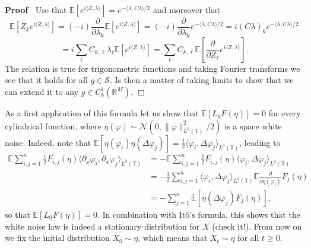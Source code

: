 \documentclass[a4paper,11pt]{article}
\newenvironment{proof}{\noindent\textbf{Proof\ }}{\hspace*{\fill}$\Box$\medskip}
\newcommand{\CS}{\mathscr{S}}
\begin{document}
\begin{proof}
  Use that $\mathbb{E} [e^{i \langle Z, \lambda \rangle}] = e^{- \langle
  \lambda, C \lambda \rangle / 2}$ and moreover that
  \[ \mathbb{E} [Z_k e^{i \langle Z, \lambda \rangle}] = (- i)
     \frac{\partial}{\partial \lambda_k} \mathbb{E} [e^{i \langle Z, \lambda
     \rangle}] = (- i) \frac{\partial}{\partial \lambda_k} e^{- \langle
     \lambda, C \lambda \rangle / 2} = i (C \lambda)_k e^{- \langle \lambda, C
     \lambda \rangle / 2} \]
  \[ = i \sum_{\ell} C_{k, \ell} \lambda_{\ell} \mathbb{E} [e^{i \langle Z,
     \lambda \rangle}] = \sum_{\ell} C_{k, \ell} \mathbb{E}
     [\frac{\partial}{\partial Z_{\ell}} e^{i \langle Z, \lambda \rangle}] .
  \]
  The relation is true for trigonometric functions and taking Fourier
  transforms we see that it holds for all $g \in \CS$. Is then a matter of
  taking limits to show that we can extend it to any $g \in C^1_b
  (\mathbb{R}^M)$.
\end{proof}

As a first application of this formula let us show that $\mathbb{E} [L_0 F
(\eta)] = 0$ for every cylindrical function, where $\eta (\varphi) \sim
\mathcal{N} (0, \| \varphi \|_{L^2 (\mathbb{T})}^2 / 2)$ is a space white
noise. Indeed, note that $\mathbb{E} [\eta (\varphi_i) \eta (\Delta
\varphi_j)] = \frac{1}{2} \langle \varphi_i, \Delta \varphi_j \rangle_{L^2
(\mathbb{T})}$, leading to
\begin{align*}
   \mathbb{E} \sum_{i, j = 1}^n \frac{1}{2} F_{i, j} (\eta) \langle \partial_x \varphi_i, \partial_x \varphi_j \rangle_{L^2 (\mathbb{T})} &= -\mathbb{E} \sum_{i, j = 1}^n \frac{1}{2} F_{i, j} (\eta) \langle \varphi_i, \Delta \varphi_j \rangle_{L^2 (\mathbb{T})} \\
   & = - \frac{1}{2} \sum_{i, j = 1}^n \langle \varphi_i, \Delta \varphi_j \rangle_{L^2 (\mathbb{T})} \mathbb{E} \frac{\partial}{\partial \eta (\varphi_i)} F_j (\eta) \\
   & = - \sum_{j = 1}^n \mathbb{E} [\eta (\Delta \varphi_j) F_j (\eta)],
\end{align*}
so that $\mathbb{E} [L_0 F (\eta)] = 0$. In combination with It{\^o}'s
formula, this shows that the white noise law is indeed a stationary
distribution for $X$ (check it!). From now on we fix the initial distribution
$X_0 \sim \eta$, which means that $X_t \sim \eta$ for all $t \geqslant 0$.
\end{document}
